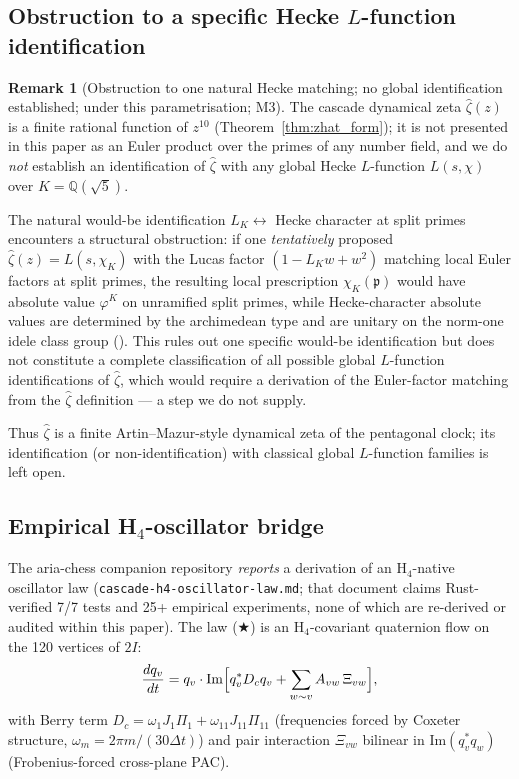 \documentclass[11pt, a4paper]{amsart}
\theoremstyle{definition}
\newtheorem{remark}[theorem]{Remark}
\newcommand{\Q}{\mathbb{Q}}
\begin{document}
\subsection{Obstruction to a specific Hecke $L$-function identification}\label{subsec:alpha_escape}

\begin{remark}[Obstruction to one natural Hecke matching; no global identification established; under this
parametrisation; M3]\label{rmk:hecke_obs}
The cascade dynamical zeta $\widehat\zeta(z)$ is a finite rational
function of $z^{10}$ (Theorem~\ref{thm:zhat_form}); it is not
presented in this paper as an Euler product over the primes of any
number field, and we do \emph{not} establish an
identification of $\widehat\zeta$ with any global Hecke
$L$-function $L(s, \chi)$ over $K = \Q(\sqrt 5)$.

The natural would-be identification $L_K \leftrightarrow$ Hecke
character at split primes encounters a structural obstruction: if
one \emph{tentatively} proposed $\widehat\zeta(z) = L(s, \chi_K)$
with the Lucas factor $(1 - L_K w + w^2)$ matching local Euler
factors at split primes, the resulting local prescription
$\chi_K(\mathfrak p)$ would have absolute value $\varphi^K$ on
unramified split primes, while Hecke-character absolute values are
determined by the archimedean type and are unitary on the
norm-one idele class group (\cite[VI.1, VII.6]{Neukirch1999}).
This rules out one specific would-be identification but does not
constitute a complete classification of all possible global
$L$-function identifications of $\widehat\zeta$, which would
require a derivation of the Euler-factor matching from the
$\widehat\zeta$ definition --- a step we do not supply.

Thus $\widehat\zeta$ is a finite Artin--Mazur-style
dynamical zeta of the pentagonal clock; its identification (or
non-identification) with classical global $L$-function families is
left open.
\end{remark}

\subsection{Empirical H$_4$-oscillator bridge}\label{subsec:h4o_bridge}

The aria-chess companion repository \emph{reports} a derivation of
an H$_4$-native oscillator law
(\texttt{cascade-h4-oscillator-law.md}; that document claims
Rust-verified 7/7 tests and 25+ empirical experiments, none of
which are re-derived or audited within this paper).  The law (★) is an H$_4$-covariant quaternion
flow on the 120 vertices of $2I$:
\[
\frac{dq_v}{dt} = q_v \cdot \mathrm{Im}\Bigl[ q_v^* D_c q_v +
  \sum_{w \sim v} A_{vw} \, \Xi_{vw} \Bigr],
\]
with Berry term $D_c = \omega_1 J_1 \Pi_1 + \omega_{11} J_{11}
\Pi_{11}$ (frequencies forced by Coxeter structure, $\omega_m = 2\pi
m / (30 \Delta t)$) and pair interaction $\Xi_{vw}$ bilinear in
$\mathrm{Im}(q_v^* q_w)$ (Frobenius-forced cross-plane PAC).
\end{document}
